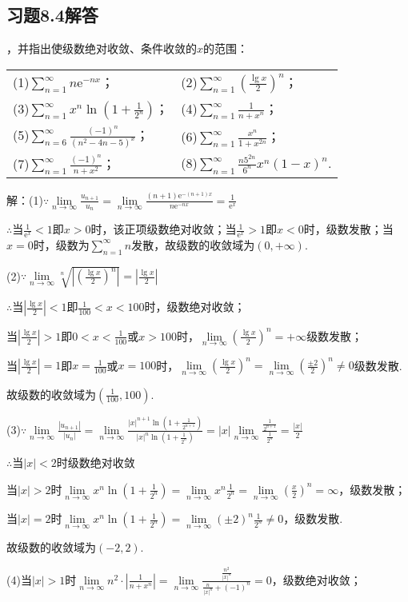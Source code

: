 \documentclass[12pt,UTF8]{ctexart}
\newcommand\Lim[0]{\lim\limits_{n\rightarrow\infty}}
\newcommand\Ser[1]{\sum_{n=#1}^\infty}
\begin{document}
\subsection{习题8.4解答}
\begin{enumerate}
，并指出使级数绝对收敛、条件收敛的$x$的范围：
\newline
\begin{tabular}{ll}
(1)$\Ser{1}n\mathrm e^{-nx}$；&(2)$\Ser{1}(\frac{\lg x}2)^n$；\\
(3)$\Ser{1}x^n\ln(1+\frac1{2^n})$；&(4)$\Ser{1}\frac1{n+x^n}$；\\
(5)$\Ser{6}\frac{(-1)^n}{(n^2-4n-5)^x}$；&(6)$\Ser{1}\frac{x^n}{1+x^{2n}}$；\\
(7)$\Ser{1}\frac{(-1)^n}{n+x^2}$；&(8)$\Ser{1}\frac{n5^{2n}}{6^n}x^n(1-x)^n$.
\end{tabular}

解：(1)$\because\Lim\frac{u_{n+1}}{u_n}=\Lim\frac{(n+1)\mathrm e^{-(n+1)x}}{n\mathrm e^{-nx}}=\frac1{\mathrm e^x}$

$\therefore$当$\frac1{\mathrm e^x}<1$即$x>0$时，该正项级数绝对收敛；当$\frac1{\mathrm e^x}>1$即$x<0$时，级数发散；当$x=0$时，级数为$\Ser{1}n$发散，故级数的收敛域为$(0,+\infty)$.

(2)$\because\Lim\sqrt[n]{|(\frac{\lg x}2)^n|}=|\frac{\lg x}2|$

$\therefore$当$|\frac{\lg x}2|<1$即$\frac1{100}<x<100$时，级数绝对收敛；

当$|\frac{\lg x}2|>1$即$0<x<\frac1{100}$或$x>100$时，$\Lim(\frac{\lg x}2)^n=+\infty$级数发散；

当$|\frac{\lg x}2|=1$即$x=\frac1{100}$或$x=100$时，$\Lim(\frac{\lg x}2)^n=\Lim(\frac{\pm2}2)^n\neq0$级数发散.

故级数的收敛域为$(\frac1{100},100)$.

(3)$\because\Lim\frac{|u_{n+1}|}{|u_n|}=\Lim\frac{|x|^{n+1}\ln(1+\frac1{2^{n+1}})}{|x|^n\ln(1+\frac1{2^n})}=|x|\Lim\frac{\frac1{2^{n+1}}}{\frac1{2^n}}=\frac{|x|}2$

$\therefore$当$|x|<2$时级数绝对收敛

当$|x|>2$时$\Lim x^n\ln(1+\frac1{2^n})=\Lim x^n\frac1{2^n}=\Lim(\frac x2)^n=\infty$，级数发散；

当$|x|=2$时$\Lim x^n\ln(1+\frac1{2^n})=\Lim(\pm2)^n\frac1{2^n}\neq0$，级数发散.

故级数的收敛域为$(-2,2)$.

(4)当$|x|>1$时$\Lim n^2\cdot|\frac1{n+x^n}|=\Lim\frac{\frac{n^2}{|x|^n}}{\frac n{|x|^n}+(-1)^n}=0$，级数绝对收敛；


\end{enumerate}
\end{document}
